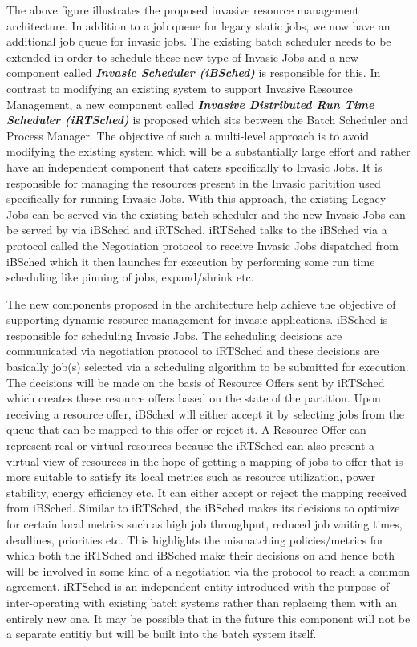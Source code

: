 The above figure illustrates the proposed invasive resource management architecture. In addition to a job queue for legacy static jobs, we now have an additional job queue for invasic jobs. The existing batch scheduler needs to be extended in order to schedule these new type of Invasic Jobs and a new component called \textbf{\textit{Invasic Scheduler (iBSched)}} is responsible for this. In contrast to modifying an existing system to support Invasive Resource Management, a new component called \textbf{\textit{Invasive Distributed Run Time Scheduler (iRTSched)}} is proposed which sits between the Batch Scheduler and Process Manager. The objective of such a multi-level approach is to avoid modifying the existing system which will be a substantially large effort and rather have an independent component that caters specifically to Invasic Jobs. It is responsible for managing the resources present in the Invasic paritition used specifically for running Invasic Jobs. With this approach, the existing Legacy Jobs can be served via the existing batch scheduler and the new Invasic Jobs can be served by via iBSched and iRTSched. iRTSched talks to the iBSched via a protocol called the Negotiation protocol to receive Invasic Jobs dispatched from iBSched which it then launches for execution by performing some run time scheduling like pinning of jobs, expand/shrink etc.\\ \par
\noindent
The new components proposed in the architecture help achieve the objective of supporting dynamic resource management for invasic applications. iBSched is responsible for scheduling Invasic Jobs. The scheduling decisions are communicated via negotiation protocol to iRTSched and these decisions are basically job(s) selected via a scheduling algorithm to be submitted for execution. The decisions will be made on the basis of Resource Offers sent by iRTSched which creates these resource offers based on the state of the partition. Upon receiving a resource offer, iBSched will either accept it by selecting jobs from the queue that can be mapped to this offer or reject it. A Resource Offer can represent real or virtual resources because the iRTSched can also present a virtual view of resources in the hope of getting a mapping of jobs to offer that is more suitable to satisfy its local metrics such as resource utilization, power stability, energy efficiency etc. It can either accept or reject the mapping received from iBSched. Similar to iRTSched, the iBSched makes its decisions to optimize for certain local metrics such as high job throughput, reduced job waiting times, deadlines, priorities etc. This highlights the mismatching policies/metrics for which both the iRTSched and iBSched make their decisions on and hence both will be involved in some kind of a negotiation via the protocol to reach a common agreement. iRTSched is an independent entity introduced with the purpose of inter-operating with existing batch systems rather than replacing them with an entirely new one. It may be possible that in the future this component will not be a separate entitiy but will be built into the batch system itself.
